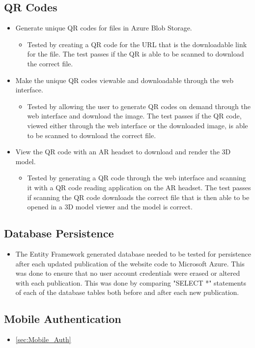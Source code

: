 \subsection{QR Codes}
\begin{itemize}
    \item Generate unique QR codes for files in Azure Blob Storage.
    \begin{itemize}
        \item Tested by creating a QR code for the URL that is the downloadable link for the file. The test passes if the QR is able to be scanned to download the correct file.
    \end{itemize}    

    \item Make the unique QR codes viewable and downloadable through the web interface.
    \begin{itemize}
        \item Tested by allowing the user to generate QR codes on demand through the web interface and download the image. The test passes if the QR code, viewed either through the web interface or the downloaded image, is able to be scanned to download the correct file.
    \end{itemize}    

    \item View the QR code with an AR headset to download and render the 3D model.
    \begin{itemize}
        \item Tested by generating a QR code through the web interface and scanning it with a QR code reading application on the AR headset. The test passes if scanning the QR code downloads the correct file that is then able to be opened in a 3D model viewer and the model is correct.
    \end{itemize} 
\end{itemize}


\subsection{Database Persistence}
\begin{itemize}
    \item The Entity Framework generated database needed to be tested for persistence after each updated publication of the website code to Microsoft Azure. This was done to ensure that no user account credentials were erased or altered with each publication.  This was done by comparing "SELECT *" statements of each of the database tables both before and after each new publication.
\end{itemize}

\subsection{Mobile Authentication}
\begin{itemize} \item \ref{sec:Mobile_Auth} \end{itemize}

